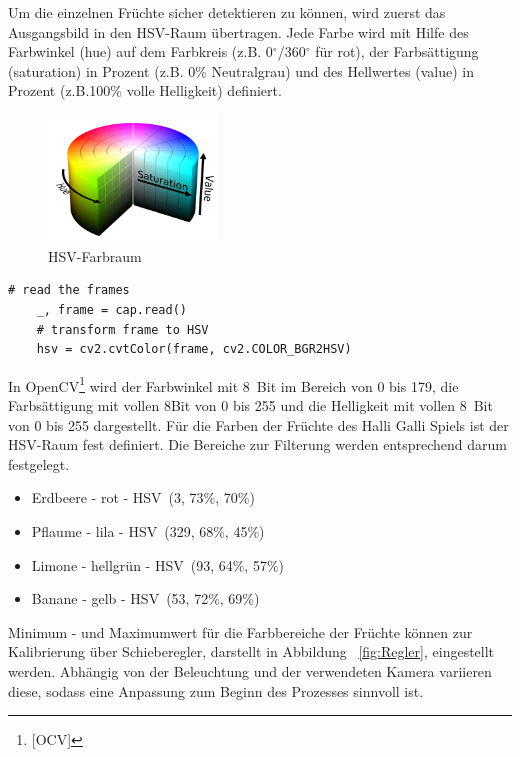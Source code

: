 Um die einzelnen Früchte sicher detektieren zu können, wird zuerst das Ausgangsbild in den HSV-Raum übertragen. Jede Farbe wird mit Hilfe des Farbwinkel (hue) auf dem Farbkreis (z.B. 0$^\circ$/360$^\circ$  für rot), der Farbsättigung (saturation) in Prozent (z.B. 0\% Neutralgrau) und des Hellwertes (value) in Prozent (z.B.100\% volle Helligkeit) definiert.
\begin{figure}[H]
    \centering
    \includegraphics[width=0.4\textwidth]{Abbildungen/HSV_color}
    \caption[HSV]{HSV-Farbraum}
    \label{fig:HSV-Farbraum}
\end{figure}
\lstset{language=Python}
\begin{lstlisting}[]
    # read the frames
    _, frame = cap.read()
    # transform frame to HSV
    hsv = cv2.cvtColor(frame, cv2.COLOR_BGR2HSV)
\end{lstlisting}
In OpenCV\footnote{[OCV]} wird der Farbwinkel mit 8~Bit im Bereich von 0 bis 179, die Farbsättigung mit vollen 8Bit von 0 bis 255 und die Helligkeit mit vollen 8~Bit von 0 bis 255 dargestellt.
Für die Farben der Früchte des Halli Galli Spiels ist der HSV-Raum fest definiert. Die Bereiche zur Filterung werden entsprechend darum festgelegt. 

\begin{itemize}
    \item Erdbeere - rot - HSV~(3, 73\%, 70\%)
    \item Pflaume - lila - HSV~(329, 68\%, 45\%)
    \item Limone - hellgrün - HSV~(93, 64\%, 57\%)
    \item Banane - gelb - HSV~(53, 72\%, 69\%)
\end{itemize}

Minimum - und Maximumwert für die Farbbereiche der Früchte können zur Kalibrierung über Schieberegler, darstellt in Abbildung ~\ref{fig:Regler}, eingestellt werden. Abhängig von der Beleuchtung und der verwendeten Kamera variieren diese, sodass eine Anpassung zum Beginn des Prozesses sinnvoll ist. 

